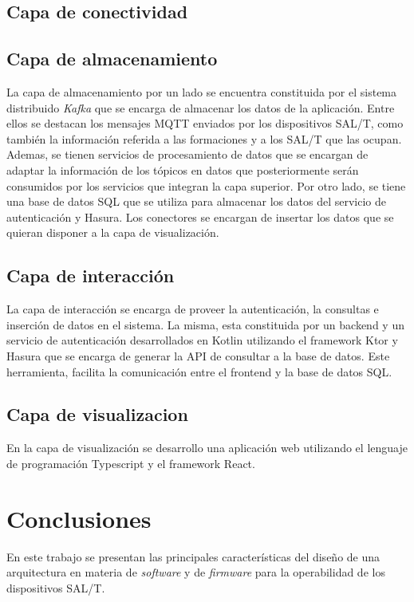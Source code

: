 \documentclass[10pt, a4paper, twocolumn]{article} %
\begin{document}
\subsection{Capa de conectividad}

\subsection{Capa de almacenamiento}

La capa de almacenamiento por un lado se encuentra constituida por el sistema distribuido \textit{Kafka} que se encarga
de almacenar los datos de la aplicación. Entre ellos se destacan los mensajes MQTT enviados
por los dispositivos SAL/T, como también la información referida a las formaciones y a los SAL/T que las ocupan. 
Ademas, se tienen servicios de procesamiento de datos que se encargan de adaptar la información de los tópicos en
datos que posteriormente serán consumidos por los servicios que integran la capa superior. Por otro lado,
se tiene una base de datos SQL que se utiliza para almacenar los datos del servicio de autenticación y 
Hasura. Los conectores se encargan de insertar los datos que se quieran disponer a la capa de 
visualización.

\subsection{Capa de interacción}

La capa de interacción se encarga de proveer la autenticación, la consultas e inserción de datos en el sistema.
La misma, esta constituida por un backend y un servicio de autenticación desarrollados en Kotlin utilizando el framework Ktor y
Hasura que se encarga de generar la API de consultar a la base de datos. Este herramienta, 
facilita la comunicación entre el frontend y la base de datos SQL. 

\subsection{Capa de visualizacion}

En la capa de visualización se desarrollo una aplicación web utilizando el lenguaje
de programación Typescript y el framework React.

\section{Conclusiones}

En este trabajo se presentan las principales características del diseño de una arquitectura en materia de \textit{software} y de \textit{firmware} para la operabilidad de los dispositivos SAL/T.
\end{document}
